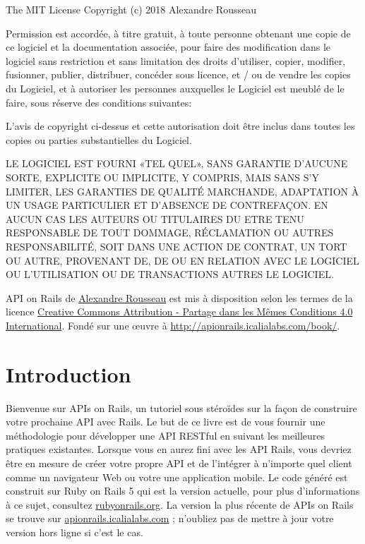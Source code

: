 \documentclass[]{report}
\begin{document}
    \begin{tcolorbox}{The MIT License}
      Copyright (c) 2018 Alexandre Rousseau

      Permission est accordée, à titre gratuit, à toute personne obtenant une copie de ce logiciel et la documentation associée, pour faire des modification dans le logiciel sans restriction et sans limitation des droits d’utiliser, copier, modifier, fusionner, publier, distribuer, concéder sous licence, et / ou de vendre les copies du Logiciel, et à autoriser les personnes auxquelles le Logiciel est meublé de le faire, sous réserve des conditions suivantes:

      L’avis de copyright ci-dessus et cette autorisation doit être inclus dans toutes les copies ou parties substantielles du Logiciel.

      LE LOGICIEL EST FOURNI «TEL QUEL», SANS GARANTIE D’AUCUNE SORTE, EXPLICITE OU IMPLICITE, Y COMPRIS, MAIS SANS S’Y LIMITER, LES GARANTIES DE QUALITÉ MARCHANDE, ADAPTATION À UN USAGE PARTICULIER ET D’ABSENCE DE CONTREFAÇON. EN AUCUN CAS LES AUTEURS OU TITULAIRES DU ETRE TENU RESPONSABLE DE TOUT DOMMAGE, RÉCLAMATION OU AUTRES RESPONSABILITÉ, SOIT DANS UNE ACTION DE CONTRAT, UN TORT OU AUTRE, PROVENANT DE, DE OU EN RELATION AVEC LE LOGICIEL OU L’UTILISATION OU DE TRANSACTIONS AUTRES LE LOGICIEL.
    \end{tcolorbox}

    API on Rails de \href{https://github.com/madeindjs/api_on_rails}{Alexandre Rousseau} est mis à disposition selon les termes de la licence \href{http://creativecommons.org/licenses/by-sa/4.0/}{Creative Commons Attribution - Partage dans les Mêmes Conditions 4.0 International}.
    Fondé sur une œuvre à \url{http://apionrails.icalialabs.com/book/}.

\chapter{Introduction}\label{chapter:1}

  Bienvenue sur APIs on Rails, un tutoriel sous stéroïdes sur la façon de construire votre prochaine API avec Rails. Le but de ce livre est de vous fournir une méthodologie pour développer une API RESTful en suivant les meilleures pratiques existantes. Lorsque vous en aurez fini avec les API Rails, vous devriez être en mesure de créer votre propre API et de l'intégrer à n'importe quel client comme un navigateur Web ou votre une application mobile. Le code généré est construit sur Ruby on Rails 5 qui est la version actuelle, pour plus d'informations à ce sujet, consultez \href{http://rubyonrails.org/}{rubyonrails.org}. La version la plus récente de APIs on Rails se trouve sur \href{https://apionrails.icalialabs.com}{apionrails.icalialabs.com} ; n'oubliez pas de mettre à jour votre version hors ligne si c'est le cas.
\end{document}
